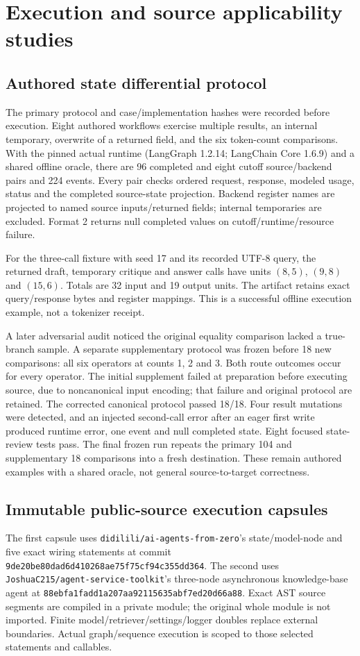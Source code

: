 \documentclass[11pt,a4paper]{article}
\newcommand{\cp}[1]{\nolinkurl{#1}}
\begin{document}
\section{Execution and source applicability studies}
\subsection{Authored state differential protocol}
The primary protocol and case/implementation hashes were recorded before execution. Eight authored workflows exercise multiple results, an internal temporary, overwrite of a returned field, and the six token-count comparisons. With the pinned actual runtime (LangGraph 1.2.14; LangChain Core 1.6.9) and a shared offline oracle, there are 96 completed and eight cutoff source/backend pairs and 224 events. Every pair checks ordered request, response, modeled usage, status and the completed source-state projection. Backend register names are projected to named source inputs/returned fields; internal temporaries are excluded. Format 2 returns null completed values on cutoff/runtime/resource failure.

For the three-call fixture with seed 17 and its recorded UTF-8 query, the returned draft, temporary critique and answer calls have units $(8,5)$, $(9,8)$ and $(15,6)$. Totals are 32 input and 19 output units. The artifact retains exact query/response bytes and register mappings. This is a successful offline execution example, not a tokenizer receipt.

A later adversarial audit noticed the original equality comparison lacked a true-branch sample. A separate supplementary protocol was frozen before 18 new comparisons: all six operators at counts 1, 2 and 3. Both route outcomes occur for every operator. The initial supplement failed at preparation before executing source, due to noncanonical input encoding; that failure and original protocol are retained. The corrected canonical protocol passed 18/18. Four result mutations were detected, and an injected second-call error after an eager first write produced runtime error, one event and null completed state. Eight focused state-review tests pass. The final frozen run repeats the primary 104 and supplementary 18 comparisons into a fresh destination. These remain authored examples with a shared oracle, not general source-to-target correctness.

\subsection{Immutable public-source execution capsules}
The first capsule uses \cp{didilili/ai-agents-from-zero}'s state/model-node and five exact wiring statements at commit \cp{9de20be80dad6d410268ae75f75cf94c355dd364}. The second uses \cp{JoshuaC215/agent-service-toolkit}'s three-node asynchronous knowledge-base agent at \cp{88ebfa1fadd1a207aa92115635abf7ed20d66a88}. Exact AST source segments are compiled in a private module; the original whole module is not imported. Finite model/retriever/settings/logger doubles replace external boundaries. Actual graph/sequence execution is scoped to those selected statements and callables.
\end{document}
